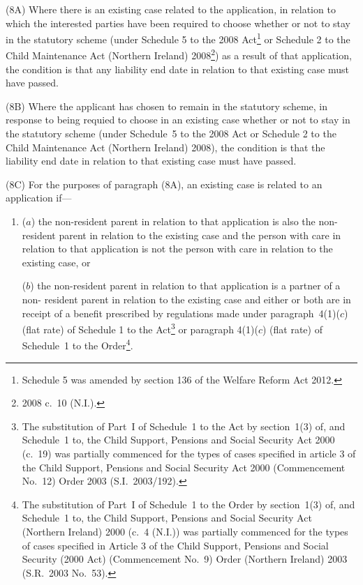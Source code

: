 \documentclass[12pt,a4paper]{article}
\begin{document}
(8A) Where there is an existing case related to the application, in relation to
which the interested parties have been required to choose whether or not to stay in 
the statutory scheme (under Schedule 5 to the 2008 Act\footnote{Schedule 5 was amended by section 136 of the Welfare Reform Act 2012.} or Schedule 2 to the Child
Maintenance Act (Northern Ireland) 2008\footnote{2008 c.~10 (N.I.).}) as a result of that application, the
condition is that any liability end date in relation to that existing case must have
passed.

(8B) Where the applicant has chosen to remain in the statutory scheme, in response
to being requied to choose in an existing case whether or not to stay in the statutory 
scheme (under Schedule~5 to the 2008 Act or Schedule 2 to the Child Maintenance 
Act (Northern Ireland) 2008), the condition is that the liability end date in relation to
that existing case must have passed.

(8C) For the purposes of paragraph (8A), an existing case is related to an
application if---
\begin{enumerate}\item[]
($a$) the non-resident parent in relation to that application is also the non-resident
parent in relation to the existing case and the person with care in relation to
that application is not the person with care in relation to the existing case, or

($b$) the non-resident parent in relation to that application is a partner of a non-%
resident parent in relation to the existing case and either or both are in 
receipt of a benefit prescribed by regulations made under paragraph~4(1)($c$)
(flat rate) of Schedule 1 to the Act\footnote{The substitution of Part~I of Schedule~1 to the Act by section~1(3) of, and Schedule~1 to, the Child Support, Pensions and Social Security Act 2000 (c.~19) was partially commenced for the types of cases specified in article 3 of the Child Support, Pensions and Social Security Act 2000 (Commencement No.~12) Order 2003 (S.I.~2003/192).} or paragraph 4(1)($c$) (flat rate) of
Schedule~1 to the Order\footnote{The substitution of Part~I of Schedule~1 to the Order by section~1(3) of, and Schedule~1 to, the Child Support, Pensions and Social Security Act (Northern Ireland) 2000 (c.~4 (N.I.)) was partially commenced for the types of cases specified in Article 3 of the Child Support, Pensions and Social Security (2000 Act) (Commencement No.~9) Order (Northern Ireland) 2003 (S.R.~2003 No.~53).}.
\end{enumerate}
\end{document}
